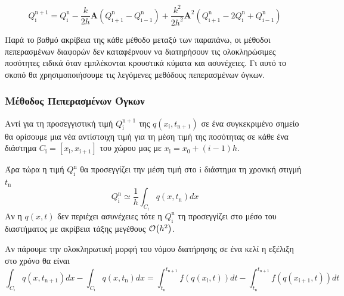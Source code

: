  \begin{equation}
 Q_{\mathrm{i}}^\mathrm{n+1} = Q_{\mathrm{i}}^\mathrm{n} -\frac{k}{2h} \mathbf{Α} \left( Q_\mathrm{i+1}^\mathrm{n} - Q_\mathrm{i-1}^\mathrm{n} \right) +\frac{k^2}{2h^2} \mathbf{Α}^2 \left( Q_\mathrm{i+1}^\mathrm{n} - 2Q_{\mathrm{i}}^\mathrm{n}+ Q_\mathrm{i-1}^\mathrm{n} \right)
 \end{equation} 
 
 Παρά το βαθμό ακρίβεια της κάθε μέθοδο μεταξύ των παραπάνω, οι μέθοδοι πεπερασμένων διαφορών δεν καταφέρνουν να διατηρήσουν τις ολοκληρώσιμες ποσότητες ειδικά όταν εμπλέκονται κρουστικά κύματα και ασυνέχειες. Γι αυτό το σκοπό θα χρησιμοποιήσουμε τις λεγόμενες μεθόδους πεπερασμένων όγκων.
 
\subsubsection{Μέθοδος Πεπερασμένων Όγκων}
Αντί για τη προσεγγιστική τιμή $Q_{\mathrm{i}}^\mathrm{n+1}$ της $q(x_\mathrm{i},t_\mathrm{n+1})$ σε ένα συγκεκριμένο σημείο θα ορίσουμε μια νέα αντίστοιχη τιμή για τη μέση τιμή της ποσότητας σε κάθε ένα διάστημα $C_\mathrm{i}=[x_\mathrm{i},x_\mathrm{i+1}]$ του χώρου μας με $x_\mathrm{i}=x_0+(i-1)h$. 

Άρα τώρα η τιμή $Q_{\mathrm{i}}^\mathrm{n}$ θα προσεγγίζει την μέση τιμή στο $\mathrm{i}$ διάστημα τη χρονική στιγμή $t_\mathrm{n}$
\begin{equation}
Q_{\mathrm{i}}^\mathrm{n} \simeq \frac{1}{h} \int _{C_\mathrm{i}} q(x,t_\mathrm{n})dx
\end{equation}
Αν η $q(x,t)$ δεν περιέχει ασυνέχειες τότε η $Q_{\mathrm{i}}^\mathrm{n}$ τη προσεγγίζει στο μέσο του διαστήματος με ακρίβεια τάξης μεγέθους $\order{h^2}$.

Αν πάρουμε την ολοκληρωτική μορφή του νόμου διατήρησης σε ένα κελί η εξέλιξη στο χρόνο θα είναι
\begin{equation}
\int _{C_\mathrm{i}} q(x,t_\mathrm{n+1})dx -\int _{C_\mathrm{i}} q(x,t_\mathrm{n})dx = 
\int_{t_\mathrm{n}}^{t_\mathrm{n+1}} f(q(x_\mathrm{i},t))dt - \int_{t_\mathrm{n}}^{t_\mathrm{n+1}} f(q(x_\mathrm{i+1},t))dt
\end{equation}

